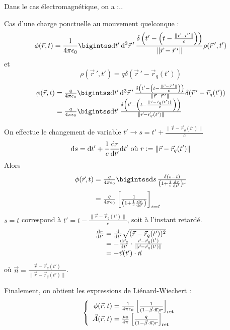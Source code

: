 Dans le cas électromagnétique, on a :..


Cas d'une charge ponctuelle au mouvement quelconque :
$$
	\phi(\vec{r},t)=\frac{1}{4\pi\epsilon_0}\bigintss \dif t'\,\dif^3 \vec{r}\,'\, 
		\frac{\delta\left(t'-\left(t-\frac{\|\vec{r}-\vec{r}\,'\|}{c}\right)\right)}
			{\|\vec{r}-\vec{r}\,'\|}\rho(\vec{r}\,',t')
$$
et
$$
	\rho(\vec{r}\,',t')=q\delta(\vec{r}\,'-\vec{r}_q(t'))
$$
$$
	\begin{array}{r@{\;}l}
		\phi(\vec{r},t)&=\frac{q}{4\pi\epsilon_0}\bigintss \dif t'\,\dif^3 \vec{r}\,'\, 
		\frac{\delta\left(t'-\left(t-\frac{\|\vec{r}-\vec{r}\,'\|}{c}\right)\right)}
			{\|\vec{r}-\vec{r}\,'\|}\delta(\vec{r}\,'-\vec{r}_q(t'))\\
		&=\frac{q}{4\pi\epsilon_0}\bigintss \dif t'\, 
		\frac{\delta\left(t'-\left(t-\frac{\|\vec{r}-\vec{r}_q(t')\|}{c}\right)\right)}
			{\|\vec{r}-\vec{r}_q(t')\|}
	\end{array}
$$


On effectue le changement de variable $t'\longrightarrow s=t'+\frac{\|\vec{r}-\vec{r}_q(t')\|}{c}$
$$
	\mathrm{d} s=\mathrm{d} t'+\frac{1}{c}\frac{\mathrm{d} r}{\mathrm{d} t'}\mathrm{d} t' \text{ où } r\vcentcolon=\|\vec{r}-\vec{r}_q(t')\|
$$
Alors
$$
	\begin{array}{r@{\;}l}
		\phi(\vec{r},t)&=\frac{q}{4\pi\epsilon_0}\bigintss\dif s\,\frac{\delta(s-t)}{\left(1+\frac{1}{c}\frac{\dif r}{\dif t'}\right)r}\\[10pt]
		&=\frac{q}{4\pi\epsilon_0}\left[\frac{1}{\left(1+\frac{1}{c}\frac{\dif r}{\dif t'}\right)}\right]_{s=t}
	\end{array}
$$
$s=t$ correspond à $t'=t-\frac{\|\vec{r}-\vec{r}_q(t')\|}{c}$, soit à l'instant retardé.
$$
	\begin{array}{r@{\;}l}
		\frac{\dif r}{\dif t'}&=\frac{\dif}{\dif t'}\sqrt{(\vec{r}-\vec{r}_q(t'))^2}\\
			&=-\frac{\dif \vec{r}_q}{\dif t'}\cdot\frac{\vec{r}-\vec{r}_q(t')}{\|\vec{r}-\vec{r}_q(t')\|}\\
			&=-\vec{v}(t')\cdot\vec{n}
	\end{array}
$$
où $\vec{n}=\frac{\vec{r}-\vec{r}_q(t')}{\|\vec{r}-\vec{r}_q(t')\|}$.

Finalement, on obtient les expressions de Liénard-Wiechert :
$$
	\left\{\begin{array}{r@{\;}l}
		\phi(\vec{r},t)&=\frac{1}{4\pi\epsilon_0}\left[\frac{1}{(1-\vec{\beta}\cdot\vec{n})r}\right]_{\text{ret}}\\
		\vec{A}(\vec{r},t)&=\frac{\mu_0}{4\pi}\left[\frac{q}{(1-\vec{\beta}\cdot\vec{n})r}\right]_{\text{ret}}\\
	\end{array}\right.
$$

